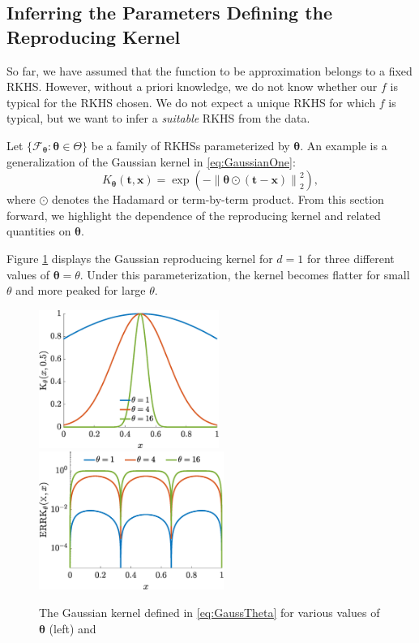 \documentclass[]{mcom-l}
\theoremstyle{plain}
\theoremstyle{definition}
\newcommand{\bx}{{\boldsymbol{x}}}
\newcommand{\bt}{{\boldsymbol{t}}}
\newcommand{\btheta}{{\boldsymbol{\theta}}}
\newcommand{\calf}{{\mathcal{F}}}
\newcommand{\norm}[2][{}]{\ensuremath{\left \lVert #2 \right \rVert}_{#1}}
\begin{document}
\subsection{Inferring the Parameters Defining the Reproducing Kernel} \label{sec:adaptTheta}

So far, we have assumed that the function to be approximation belongs to a fixed RKHS.  However, without  a priori knowledge, we do not know whether our $f$ is typical for  the RKHS chosen.  We do not expect a unique RKHS for which $f$ is typical, but we want to infer a \emph{suitable} RKHS from the data.  

Let $\{\calf_{\btheta} : \btheta \in \Theta\}$ be a family of RKHSs parameterized by $\btheta$.  An example is a generalization of the Gaussian kernel  in \eqref{eq:GaussianOne}:
\begin{equation} \label{eq:GaussTheta}
K_\btheta(\bt,\bx) =  \exp(-\norm[2]{\btheta \odot (\bt-\bx)}^2),
\end{equation}
where $\odot$ denotes the Hadamard or term-by-term product.  From this section forward, we highlight the dependence of the reproducing kernel and related quantities on $\btheta$.

Figure \ref{fig:GaussThPlot} displays the Gaussian reproducing kernel for $d=1$ for three different values of $\btheta = \theta$.  Under this parameterization, the kernel becomes flatter for small $\theta$ and more peaked for large $\theta$. 

\begin{figure}[H]
	\centering
	\includegraphics[height = 4.5cm]{ProgramsImages/KthetaPlot.eps} \quad
	\includegraphics[height = 4.5cm]{ProgramsImages/errKplotth.eps}
	\caption{The Gaussian kernel defined in \eqref{eq:GaussTheta} for various values of $\btheta$ (left) and \label{fig:GaussThPlot}}
\end{figure}
\end{document}
